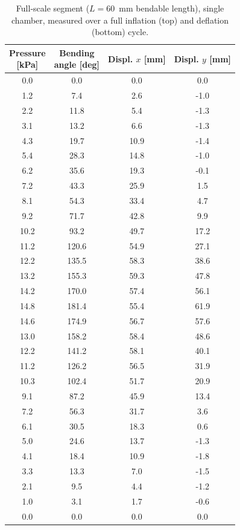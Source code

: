 \begin{table}[tbh]
  \caption{Full-scale segment ($L=60$~mm bendable length), single chamber,
  measured over a full inflation (top) and deflation (bottom) cycle.}
  \label{tab:app-fullscale}
  \centering
  \footnotesize
  \setlength{\tabcolsep}{5pt}
  \begin{tabular}{|c|c|c|c|}
    \hline
    \makecell{Pressure\\{[}kPa{]}} & \makecell{Bending\\angle [deg]} & \makecell{Displ. $x$\\{[}mm{]}} & \makecell{Displ. $y$\\{[}mm{]}} \\ \hline
    0.0 & 0.0 & 0.0 & 0.0 \\ \hline
    1.2 & 7.4 & 2.6 & -1.0 \\ \hline
    2.2 & 11.8 & 5.4 & -1.3 \\ \hline
    3.1 & 13.2 & 6.6 & -1.3 \\ \hline
    4.3 & 19.7 & 10.9 & -1.4 \\ \hline
    5.4 & 28.3 & 14.8 & -1.0 \\ \hline
    6.2 & 35.6 & 19.3 & -0.1 \\ \hline
    7.2 & 43.3 & 25.9 & 1.5 \\ \hline
    8.1 & 54.3 & 33.4 & 4.7 \\ \hline
    9.2 & 71.7 & 42.8 & 9.9 \\ \hline
    10.2 & 93.2 & 49.7 & 17.2 \\ \hline
    11.2 & 120.6 & 54.9 & 27.1 \\ \hline
    12.2 & 135.5 & 58.3 & 38.6 \\ \hline
    13.2 & 155.3 & 59.3 & 47.8 \\ \hline
    14.2 & 170.0 & 57.4 & 56.1 \\ \hline
    14.8 & 181.4 & 55.4 & 61.9 \\ \hline
    14.6 & 174.9 & 56.7 & 57.6 \\ \hline
    13.0 & 158.2 & 58.4 & 48.6 \\ \hline
    12.2 & 141.2 & 58.1 & 40.1 \\ \hline
    11.2 & 126.2 & 56.5 & 31.9 \\ \hline
    10.3 & 102.4 & 51.7 & 20.9 \\ \hline
    9.1 & 87.2 & 45.9 & 13.4 \\ \hline
    7.2 & 56.3 & 31.7 & 3.6 \\ \hline
    6.1 & 30.5 & 18.3 & 0.6 \\ \hline
    5.0 & 24.6 & 13.7 & -1.3 \\ \hline
    4.1 & 18.4 & 10.9 & -1.8 \\ \hline
    3.3 & 13.3 & 7.0 & -1.5 \\ \hline
    2.1 & 9.5 & 4.4 & -1.2 \\ \hline
    1.0 & 3.1 & 1.7 & -0.6 \\ \hline
    0.0 & 0.0 & 0.0 & 0.0 \\ \hline
  \end{tabular}
\end{table}

